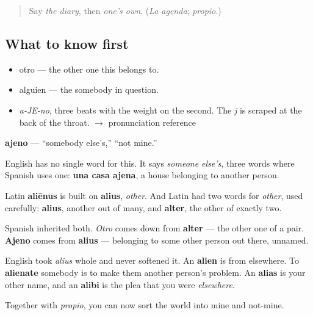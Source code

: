 \label{lesson:ES-C350-ajeno}



\begin{quote}
Say \emph{the diary}, then \emph{one's own}. (\emph{La agenda}; \emph{propio}.)
\end{quote}

\subsection*{What to know first}
\begin{itemize}
\raggedright
  \item otro — the other one this belongs to.
  \item alguien — the somebody in question.
\end{itemize}

\begin{sounds}
\begin{itemize}
\raggedright
  \item \emph{a-JE-no}, three beats with the weight on the second. The \emph{j} is scraped at the back of the throat. $\to$ pronunciation reference
\end{itemize}
\end{sounds}

\begin{cousinweb}
\textbf{ajeno} — \textquotedblleft{}somebody else's,\textquotedblright{} \textquotedblleft{}not mine.\textquotedblright{}

English has no single word for this. It says \emph{someone else's}, three words where Spanish uses one: \textbf{una casa ajena}, a house belonging to another person.

Latin \textbf{aliēnus} is built on \textbf{alius}, \emph{other}. And Latin had two words for \emph{other}, used carefully: \textbf{alius}, another out of many, and \textbf{alter}, the other of exactly two.

Spanish inherited both. \emph{Otro} comes down from \textbf{alter} — the other one of a pair. \textbf{Ajeno} comes from \textbf{alius} — belonging to some other person out there, unnamed.

English took \emph{alius} whole and never softened it. An \textbf{alien} is from elsewhere. To \textbf{alienate} somebody is to make them another person's problem. An \textbf{alias} is your other name, and an \textbf{alibi} is the plea that you were \emph{elsewhere}.

Together with \emph{propio}, you can now sort the world into mine and not-mine.
\end{cousinweb}

